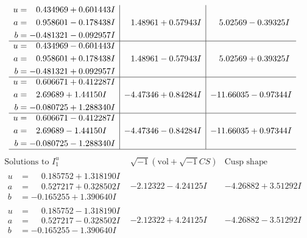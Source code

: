 \documentclass[1p]{elsarticle_modified}
\theoremstyle{definition}
\newcommand{\I}{\sqrt{-1}}
\begin{document}
$$\begin{array}{c|c|c}
\begin{aligned}
u &= \phantom{-}0.434969 + 0.601443 I \\
a &= \phantom{-}0.958601 - 0.178438 I \\
b &= -0.481321 - 0.092957 I\end{aligned}
 & \phantom{-}1.48961 + 0.57943 I & \phantom{-}5.02569 - 0.39325 I \\ \hline\begin{aligned}
u &= \phantom{-}0.434969 - 0.601443 I \\
a &= \phantom{-}0.958601 + 0.178438 I \\
b &= -0.481321 + 0.092957 I\end{aligned}
 & \phantom{-}1.48961 - 0.57943 I & \phantom{-}5.02569 + 0.39325 I \\ \hline\begin{aligned}
u &= \phantom{-}0.606671 + 0.412287 I \\
a &= \phantom{-}2.69689 + 1.44150 I \\
b &= -0.080725 + 1.288340 I\end{aligned}
 & -4.47346 + 0.84284 I & -11.66035 - 0.97344 I \\ \hline\begin{aligned}
u &= \phantom{-}0.606671 - 0.412287 I \\
a &= \phantom{-}2.69689 - 1.44150 I \\
b &= -0.080725 - 1.288340 I\end{aligned}
 & -4.47346 - 0.84284 I & -11.66035 + 0.97344 I\\
 \hline 
 \end{array}$$\newpage$$\begin{array}{c|c|c}  
\text{Solutions to }I^u_{1}& \I (\text{vol} + \sqrt{-1}CS) & \text{Cusp shape}\\
 \hline 
\begin{aligned}
u &= \phantom{-}0.185752 + 1.318190 I \\
a &= \phantom{-}0.527217 + 0.328502 I \\
b &= -0.165255 + 1.390640 I\end{aligned}
 & -2.12322 - 4.24125 I & -4.26882 + 3.51292 I \\ \hline\begin{aligned}
u &= \phantom{-}0.185752 - 1.318190 I \\
a &= \phantom{-}0.527217 - 0.328502 I \\
b &= -0.165255 - 1.390640 I\end{aligned}
 & -2.12322 + 4.24125 I & -4.26882 - 3.51292 I \\ \hline\begin{aligned}

\end{aligned}
\end{array}$$
\end{document}

